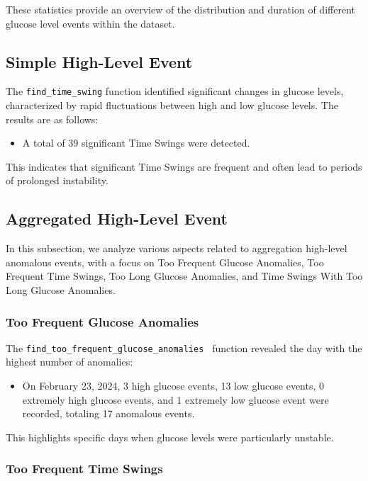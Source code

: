 \documentclass{article}
\begin{document}
These statistics provide an overview of the distribution and duration of different glucose level events within the dataset.


\subsection{Simple High-Level Event}

The \texttt{find\_time\_swing} function identified significant changes in glucose levels, characterized by rapid fluctuations between high and low glucose levels. The results are as follows:

\begin{itemize}
    \item A total of 39 significant Time Swings were detected.
\end{itemize}

This indicates that significant Time Swings are frequent and often lead to periods of prolonged instability.

\subsection{Aggregated High-Level Event}

In this subsection, we analyze various aspects related to aggregation high-level anomalous events, with a focus on Too Frequent Glucose Anomalies, Too Frequent Time Swings, Too Long Glucose Anomalies, and Time Swings With Too Long Glucose Anomalies.

\subsubsection{Too Frequent Glucose Anomalies}

The \texttt{find\_too\_frequent\_glucose\_anomalies } function revealed the day with the highest number of anomalies:

\begin{itemize}
    \item On February 23, 2024, 3 high glucose events, 13 low glucose events, 0 extremely high glucose events, and 1 extremely low glucose event were recorded, totaling 17 anomalous events.
\end{itemize}

This highlights specific days when glucose levels were particularly unstable.

\subsubsection{Too Frequent Time Swings}
\end{document}
